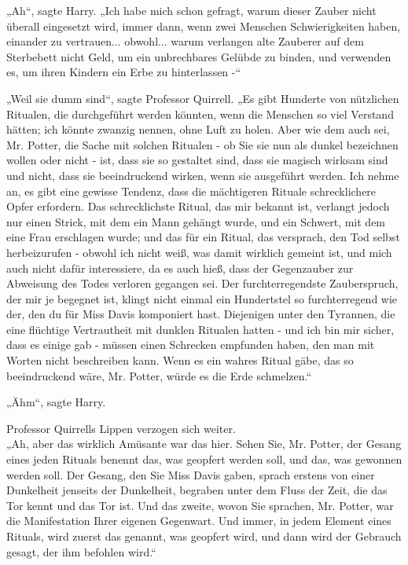{„Ah“, sagte Harry. „Ich habe mich schon gefragt, warum dieser Zauber nicht überall eingesetzt wird, immer dann, wenn zwei Menschen Schwierigkeiten haben, einander zu vertrauen... obwohl... warum verlangen alte Zauberer auf dem Sterbebett nicht Geld, um ein unbrechbares Gelübde zu binden, und verwenden es, um ihren Kindern ein Erbe zu hinterlassen -“

„Weil sie dumm sind“, sagte Professor Quirrell. „Es gibt Hunderte von nützlichen Ritualen, die durchgeführt werden könnten, wenn die Menschen so viel Verstand hätten; ich könnte zwanzig nennen, ohne Luft zu holen. Aber wie dem auch sei, Mr. Potter, die Sache mit solchen Ritualen - ob Sie sie nun als dunkel bezeichnen wollen oder nicht - ist, dass sie so gestaltet sind, dass sie magisch wirksam sind und nicht, dass sie beeindruckend wirken, wenn sie ausgeführt werden. Ich nehme an, es gibt eine gewisse Tendenz, dass die mächtigeren Rituale schrecklichere Opfer erfordern. Das schrecklichste Ritual, das mir bekannt ist, verlangt jedoch nur einen Strick, mit dem ein Mann gehängt wurde, und ein Schwert, mit dem eine Frau erschlagen wurde; und das für ein Ritual, das versprach, den Tod selbst herbeizurufen - obwohl ich nicht weiß, was damit wirklich gemeint ist, und mich auch nicht dafür interessiere, da es auch hieß, dass der Gegenzauber zur Abweisung des Todes verloren gegangen sei. Der furchterregendste Zauberspruch, der mir je begegnet ist, klingt nicht einmal ein Hundertstel so furchterregend wie der, den du für Miss Davis komponiert hast. Diejenigen unter den Tyrannen, die eine flüchtige Vertrautheit mit dunklen Ritualen hatten - und ich bin mir sicher, dass es einige gab - müssen einen Schrecken empfunden haben, den man mit Worten nicht beschreiben kann. Wenn es ein wahres Ritual gäbe, das so beeindruckend wäre, Mr. Potter, würde es die Erde schmelzen.“

„Ähm“, sagte Harry.

Professor Quirrells Lippen verzogen sich weiter.\\ „Ah, aber das wirklich Amüsante war das hier. Sehen Sie, Mr. Potter, der Gesang eines jeden Rituals benennt das, was geopfert werden soll, und das, was gewonnen werden soll. Der Gesang, den Sie Miss Davis gaben, sprach erstens von einer Dunkelheit jenseits der Dunkelheit, begraben unter dem Fluss der Zeit, die das Tor kennt und das Tor ist. Und das zweite, wovon Sie sprachen, Mr. Potter, war die Manifestation Ihrer eigenen Gegenwart. Und immer, in jedem Element eines Rituals, wird zuerst das genannt, was geopfert wird, und dann wird der Gebrauch gesagt, der ihm befohlen wird.“

}
